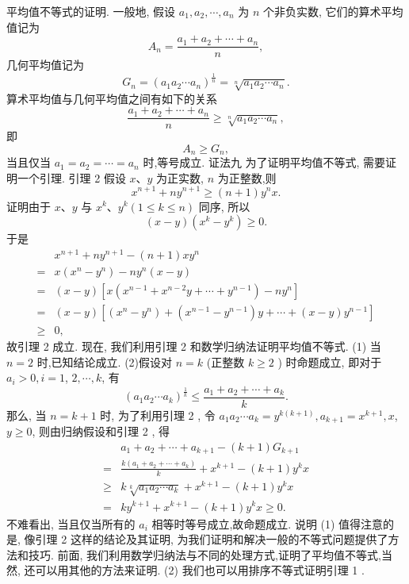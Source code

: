 平均值不等式的证明.
一般地, 假设 $a_1, a_2, \cdots, a_n$ 为 $n$ 个非负实数, 它们的算术平均值记为
$$
A_n=\frac{a_1+a_2+\cdots+a_n}{n},
$$
几何平均值记为
$$
G_n=\left(a_1 a_2 \cdots a_n\right)^{\frac{1}{n}}=\sqrt[n]{a_1 a_2 \cdots a_n} .
$$
算术平均值与几何平均值之间有如下的关系
$$
\frac{a_1+a_2+\cdots+a_n}{n} \geqslant \sqrt[n]{a_1 a_2 \cdots a_n},
$$
即
$$
A_n \geqslant G_n,
$$
当且仅当 $a_1=a_2=\cdots=a_n$ 时,等号成立.
证法九 
为了证明平均值不等式, 需要证明一个引理.
引理 2 假设 $x 、 y$ 为正实数, $n$ 为正整数,则
$$
x^{n+1}+n y^{n+1} \geqslant(n+1) y^n x .
$$
证明由于 $x 、 y$ 与 $x^k 、 y^k(1 \leqslant k \leqslant n)$ 同序, 所以
$$
(x-y)\left(x^k-y^k\right) \geqslant 0 .
$$
于是
$$
\begin{aligned}
& x^{n+1}+n y^{n+1}-(n+1) x y^n \\
= & x\left(x^n-y^n\right)-n y^n(x-y) \\
= & (x-y)\left[x\left(x^{n-1}+x^{n-2} y+\cdots+y^{n-1}\right)-n y^n\right] \\
= & (x-y)\left[\left(x^n-y^n\right)+\left(x^{n-1}-y^{n-1}\right) y+\cdots+(x-y) y^{n-1}\right] \\
\geqslant & 0,
\end{aligned}
$$
故引理 2 成立.
现在, 我们利用引理 2 和数学归纳法证明平均值不等式.
(1) 当 $n=2$ 时,已知结论成立.
(2)假设对 $n=k$ (正整数 $k \geqslant 2$ ) 时命题成立, 即对于 $a_i>0, i=1$, $2, \cdots, k$, 有
$$
\left(a_1 a_2 \cdots a_k\right)^{\frac{1}{k}} \leqslant \frac{a_1+a_2+\cdots+a_k}{k} .
$$
那么, 当 $n=k+1$ 时, 为了利用引理 2 , 令 $a_1 a_2 \cdots a_k=y^{k(k+1)}, a_{k+1}=x^{k+1}, x$, $y \geqslant 0$, 则由归纳假设和引理 2 , 得
$$
\begin{aligned}
& a_1+a_2+\cdots+a_{k+1}-(k+1) G_{k+1} \\
= & \frac{k\left(a_1+a_2+\cdots+a_k\right)}{k}+x^{k+1}-(k+1) y^k x \\
\geqslant & k \sqrt[k]{a_1 a_2 \cdots a_k}+x^{k+1}-(k+1) y^k x \\
= & k y^{k+1}+x^{k+1}-(k+1) y^k x \geqslant 0 .
\end{aligned}
$$
不难看出, 当且仅当所有的 $a_i$ 相等时等号成立,故命题成立.
说明 (1) 值得注意的是, 像引理 2 这样的结论及其证明, 为我们证明和解决一般的不等式问题提供了方法和技巧.
前面, 我们利用数学归纳法与不同的处理方式,证明了平均值不等式,当然, 还可以用其他的方法来证明.
(2) 我们也可以用排序不等式证明引理 1 .



